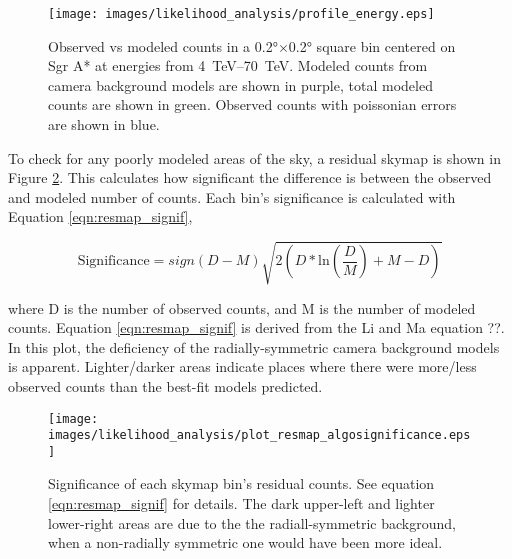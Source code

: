   \begin{figure}[h]
    \centering
    \texttt{[image: images/likelihood\_analysis/profile\_energy.eps]}
    \caption[Galactic Center Profile vs Energy]{
      Observed vs modeled counts in a \ang{0.2}$\times$\ang{0.2} square bin centered on Sgr A* at energies from \SIrange{4}{70}{TeV}.
      Modeled counts from camera background models are shown in purple, total modeled counts are shown in green.
      Observed counts with poissonian errors are shown in blue.
    }
    \label{fig:gc_profile_energy}
  \end{figure}
  
  To check for any poorly modeled areas of the sky, a residual skymap is shown in Figure \ref{fig:gc_resmap}.
  This calculates how significant the difference is between the observed and modeled number of counts.
  Each bin's significance is calculated with Equation \ref{eqn:resmap_signif},
  
  \begin{equation}\label{eqn:resmap_signif}
    \text{Significance} = sign(D-M) \sqrt{ 2 \left ( D * \textrm{ln} \left ( \frac{D}{M} \right ) + M - D \right ) }
  \end{equation}
  
  where D is the number of observed counts, and M is the number of modeled counts.
  Equation \ref{eqn:resmap_signif} is derived from the Li and Ma {\color{red}equation ??}. 
  In this plot, the deficiency of the radially-symmetric camera background models is apparent.
  Lighter/darker areas indicate places where there were more/less observed counts than the best-fit models predicted.
  
  \begin{figure}[ht]
    \centering
    \texttt{[image: images/likelihood\_analysis/plot\_resmap\_algosignificance.eps]}
    \caption[Galactic Center Residual Map]
    {
      Significance of each skymap bin's residual counts.
      See equation \ref{eqn:resmap_signif} for details.
      The dark upper-left and lighter lower-right areas are due to the the radiall-symmetric background, when a non-radially symmetric one would have been more ideal.
    }
    \label{fig:gc_resmap}
  \end{figure}

